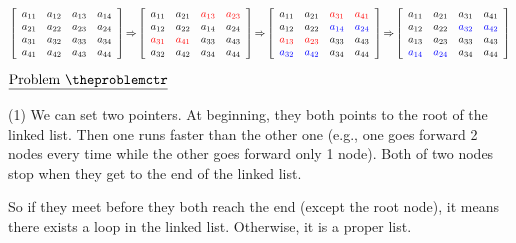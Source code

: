 \documentclass[11pt]{article}
\def\pp{\par\noindent}
\begin{document}
\begin{small}
$\left[
\begin{array}{cccc}
a_{11} & a_{12} & a_{13} & a_{14} \\
a_{21} & a_{22} & a_{23} & a_{24} \\
a_{31} & a_{32} & a_{33} & a_{34} \\
a_{41} & a_{42} & a_{43} & a_{44}%
\end{array}%
\right] {\tiny \Rightarrow }\left[
\begin{array}{cccc}
a_{11} & a_{21} & \textcolor{red}{a_{13}} & \textcolor{red}{a_{23}} \\
a_{12} & a_{22} & a_{14} & a_{24} \\
\textcolor{red}{a_{31}} & \textcolor{red}{a_{41}} & a_{33} & a_{43} \\
a_{32} & a_{42} & a_{34} & a_{44}%
\end{array}%
\right] {\tiny \Rightarrow }\left[
\begin{array}{cccc}
a_{11} & a_{21} & \textcolor{red}{a_{31}} & \textcolor{red}{a_{41}} \\
a_{12} & a_{22} & \textcolor{blue}{a_{14}} & \textcolor{blue}{a_{24}} \\
\textcolor{red}{a_{13}} & \textcolor{red}{a_{23}} & a_{33} & a_{43} \\
\textcolor{blue}{a_{32}} & \textcolor{blue}{a_{42}} & a_{34} & a_{44}%
\end{array}%
\right] {\tiny \Rightarrow }\left[
\begin{array}{cccc}
a_{11} & a_{21} & a_{31} & a_{41} \\
a_{12} & a_{22} & \textcolor{blue}{a_{32}} & \textcolor{blue}{a_{42}} \\
a_{13} & a_{23} & a_{33} & a_{43} \\
\textcolor{blue}{a_{14}} & \textcolor{blue}{a_{24}} & a_{34} & a_{44}%
\end{array}%
\right] $
\end{small}


\vfill
\newpage
\addtocounter{problemctr}{1}
\bigskip
\noindent
$\underline{\rm Problem\ \theproblemctr}$\pp
\noindent
(1) We can set two pointers. At beginning, they both points to the root of the linked list. Then one runs faster than the other one (e.g., one goes forward 2 nodes every time while the other goes forward only 1 node). Both of two nodes stop when they get to the end of the linked list.

So if they meet before they both reach the end (except the root node), it means there exists a loop in the linked list. Otherwise, it is a proper list.
\end{document}
